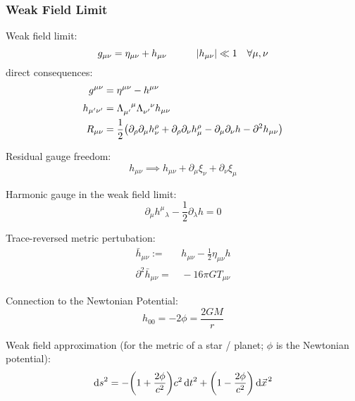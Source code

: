 		\subsubsection{Weak Field Limit}
			Weak field limit:
			\begin{equation}
				g_{\mu\nu} = \eta_{\mu\nu} + h_{\mu\nu} \hspace{30pt} \abs{h_{\mu\nu}} \ll 1 \quad \forall \mu,\nu
			\end{equation}
			direct consequences:
			\begin{equation}
				\begin{aligned}
					g^{\mu\nu} &= \eta^{\mu\nu} - h^{\mu\nu} \\
					h_{\mu'\nu'} &= \Lambda_{\mu'}^{\phantom{\mu'}\mu} \Lambda_{\nu'}^{\phantom{\nu'}\nu} h_{\mu\nu} \\
					R_{\mu\nu} &= \frac{1}{2}\qty(\partial_\rho \partial_\mu h_{\nu}^{\rho} + \partial_\rho \partial_\nu h_{\mu}^{\rho} - \partial_\mu \partial_\nu h - \partial^2 h_{\mu\nu}) \\
				\end{aligned}
			\end{equation}

			\noindent
			Residual gauge freedom:
			\begin{equation}
				h_{\mu\nu} \implies h_{\mu\nu} + \partial_\mu \xi_\nu + \partial_\nu \xi_\mu
			\end{equation}

			\noindent
			Harmonic gauge in the weak field limit:
			\begin{equation}
				\partial_\mu h^\mu{}_\lambda - \frac{1}{2}\partial_\lambda h = 0
			\end{equation}

			\noindent
			Trace-reversed metric pertubation:
			\begin{equation}
				\begin{aligned}
					\bar{h}_{\mu\nu} :=&\, h_{\mu\nu} - \frac{1}{2} \eta_{\mu\nu} h \\
					\partial^2 \bar{h}_{\mu\nu} =&\, -16\pi G T_{\mu\nu}
				\end{aligned}
			\end{equation}

			\noindent
			Connection to the Newtonian Potential:
			\begin{equation}
				h_{00} = -2\phi = \frac{2GM}{r}
			\end{equation}

			\noindent
			Weak field approximation (\eg for the metric of a star / planet; $\phi$ is the Newtonian potential):
			\begin{equation}
				\label{eq:WeakFieldMetric}
				\dd{s}^2 = -\qty(1+\frac{2\phi}{c^2}) c^2 \dd{t}^2 + \qty(1-\frac{2\phi}{c^2}) \dd{\vec{x}}^2
			\end{equation}

